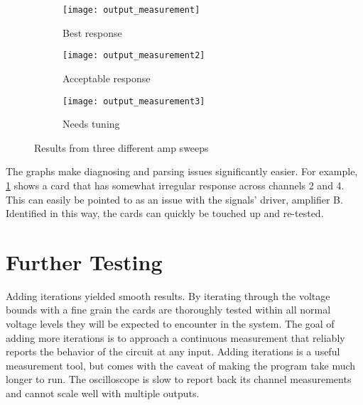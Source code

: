 \begin{figure}[!htb]
	\centering
	\begin{subfigure}[b]{0.4\textwidth}
		\texttt{[image: output\_measurement]}
		\caption{Best response}
	\end{subfigure}
	\begin{subfigure}[b]{0.4\textwidth}
		\texttt{[image: output\_measurement2]}
		\caption{Acceptable response}
		\label{graphb}
	\end{subfigure}
	\begin{subfigure}[b]{0.4\textwidth}
		\texttt{[image: output\_measurement3]}
		\caption{Needs tuning}
	\end{subfigure}
	\caption{Results from three different amp sweeps}
\end{figure}
The graphs make diagnosing and parsing issues significantly easier. For example, \ref{graphb} shows a card that has somewhat irregular response across channels 2 and 4. This can easily be pointed to as an issue with the signals' driver, amplifier B. Identified in this way, the cards can quickly be touched up and re-tested.
\section{Further Testing}
Adding iterations yielded smooth results. By iterating through the voltage bounds with a fine grain the cards are thoroughly tested within all normal voltage levels they will be expected to encounter in the system. The goal of adding more iterations is to approach a continuous measurement that reliably reports the behavior of the circuit at any input. Adding iterations is a useful measurement tool, but comes with the caveat of making the program take much longer to run. The oscilloscope is slow to report back its channel measurements and cannot scale well with multiple outputs.

